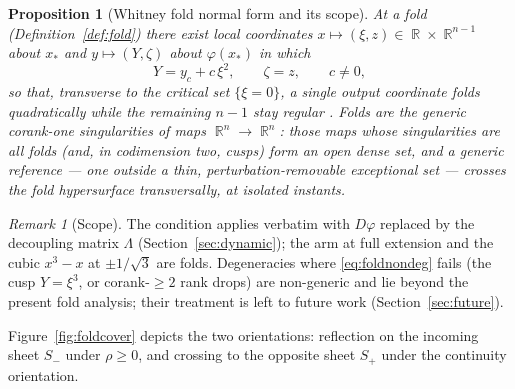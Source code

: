 \documentclass[11pt,american]{article}
\DeclareMathOperator{\R}{\mathbb{R}}
\newtheorem{proposition}{Proposition}
\theoremstyle{definition}
\theoremstyle{plain}
\theoremstyle{remark}
\newtheorem{remark}{Remark}
\begin{document}
\begin{proposition}[Whitney fold normal form and its scope]\label{prop:foldnf}
At a fold (Definition~\ref{def:fold}) there exist local coordinates $x\mapsto(\xi,z)\in\R\times\R^{n-1}$ about $x_*$ and $y\mapsto(Y,\zeta)$ about $\varphi(x_*)$ in which
\begin{equation}\label{eq:whitneynf}
Y=y_c+c\,\xi^{2},\qquad \zeta=z,\qquad c\ne0,
\end{equation}
so that, transverse to the critical set $\{\xi=0\}$, a single output coordinate folds quadratically while the remaining $n-1$ stay regular \cite{GolubitskyGuillemin1973}. Folds are the \emph{generic} corank-one singularities of maps $\R^n\to\R^n$: those maps whose singularities are all folds (and, in codimension two, cusps) form an open dense set, and a generic reference --- one outside a thin, perturbation-removable exceptional set --- crosses the fold hypersurface transversally, at isolated instants.
\end{proposition}

\begin{remark}[Scope]
The condition applies verbatim with $D\varphi$ replaced by the decoupling matrix $\Lambda$ (Section~\ref{sec:dynamic}); the arm at full extension and the cubic $x^3-x$ at $\pm1/\sqrt3$ are folds. Degeneracies where \eqref{eq:foldnondeg} fails (the cusp $Y=\xi^3$, or corank-$\ge2$ rank drops) are non-generic and lie beyond the present fold analysis; their treatment is left to future work (Section~\ref{sec:future}).
\end{remark}

Figure~\ref{fig:foldcover} depicts the two orientations: reflection on the incoming sheet $S_-$ under $\rho\ge0$, and crossing to the opposite sheet $S_+$ under the continuity orientation.
\end{document}
